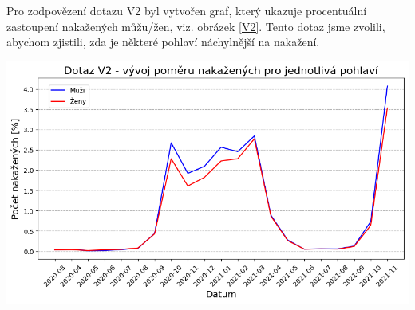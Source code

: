 \documentclass[12pt]{article}
\begin{document}
Pro zodpovězení dotazu V2 byl vytvořen graf, který ukazuje procentuální zastoupení nakažených můžu/žen, viz. obrázek \ref{V2}. Tento dotaz jsme zvolili, abychom zjistili, zda je některé pohlaví náchylnější na nakažení.

\begin{center}
    \includegraphics[width=0.7\paperwidth]{V2-nakazeni.png}
    \label{V2}
\end{center}
\end{document}
